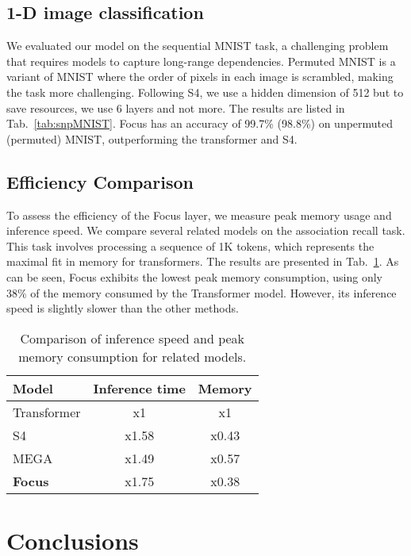 \documentclass[11pt]{article}
\begin{document}
\subsection{1-D image classification}
We evaluated our model on the sequential MNIST task, a challenging problem that requires models to capture long-range dependencies. Permuted MNIST is a variant of MNIST where the order of pixels in each image is scrambled, making the task more challenging. Following S4, we use a hidden dimension of 512 but to save resources, we use 6 layers and not more. The results are listed in Tab.~\ref{tab:snpMNIST}. Focus has an accuracy of 99.7\% (98.8\%) on unpermuted (permuted) MNIST, outperforming the transformer and S4. 




\subsection{Efficiency Comparison}
To assess the efficiency of the Focus layer, we measure peak memory usage and inference speed. We compare several related models on the association recall task. This task involves processing a sequence of 1K tokens, which represents the maximal fit in memory for transformers. The results are presented in Tab.~\ref{tab:comparisonEff}. As can be seen, Focus exhibits the lowest peak memory consumption, using only 38\% of the memory consumed by the Transformer model. However, its inference speed is slightly slower than the other methods. 
\begin{table}[t]
\centering
\begin{tabular}{@{}l@{}c@{~}c@{}}
\toprule
\textbf{Model} & Inference time & Memory \\
\midrule
Transformer & x1 & x1 \\
S4 & x1.58 & x0.43 \\
MEGA & x1.49 & x0.57 \\
\textbf{Focus} & x1.75 & x0.38 \\
\bottomrule
\end{tabular}
\caption{Comparison of inference speed and peak memory consumption for related models.}
\label{tab:comparisonEff}
\end{table}



\section{Conclusions}
\end{document}
